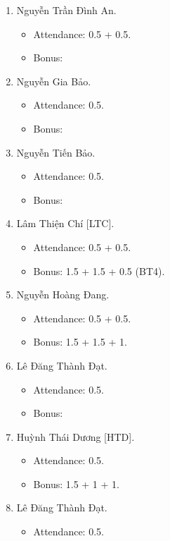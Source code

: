\documentclass{article}
\begin{document}
\begin{enumerate}
    \item {\sc Nguyễn Trần Đình An.}
    \begin{itemize}
        \item Attendance: 0.5 + 0.5.
        \item Bonus:
    \end{itemize}
    \item {\sc Nguyễn Gia Bảo.}
    \begin{itemize}
        \item Attendance: 0.5.
        \item Bonus:
    \end{itemize}
    \item {\sc Nguyễn Tiến Bảo.}
    \begin{itemize}
        \item Attendance: 0.5.
        \item Bonus:
    \end{itemize}
    \item {\sc Lâm Thiện Chí [LTC].}
    \begin{itemize}
        \item Attendance: 0.5 + 0.5.
        \item Bonus: 1.5 + 1.5 + 0.5 (BT4).
    \end{itemize}
    \item {\sc Nguyễn Hoàng Đang.}
    \begin{itemize}
        \item Attendance: 0.5 + 0.5.
        \item Bonus: 1.5 + 1.5 + 1.
    \end{itemize}
    \item {\sc Lê Đăng Thành Đạt.}
    \begin{itemize}
        \item Attendance: 0.5.
        \item Bonus:
    \end{itemize}
    \item {\sc Huỳnh Thái Dương [HTD].}
    \begin{itemize}
        \item Attendance: 0.5.
        \item Bonus: 1.5 + 1 + 1.
    \end{itemize}
    \item {\sc Lê Đăng Thành Đạt.}
    \begin{itemize}
        \item Attendance: 0.5.

\end{itemize}
\end{enumerate}
\end{document}
